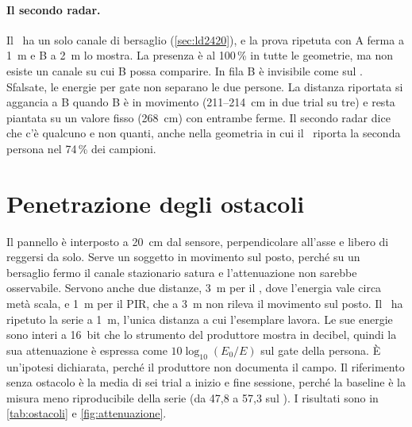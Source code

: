 \paragraph{Il secondo radar.} Il \ldc\ ha un solo canale di bersaglio
(\cref{sec:ld2420}), e la prova ripetuta con A ferma a 1~m e B a 2~m lo mostra. La
presenza è al 100\,\% in tutte le geometrie, ma non esiste un canale su cui B possa
comparire. In fila B è invisibile come sul \ldb. Sfalsate, le energie per gate non
separano le due persone. La distanza riportata si aggancia a B quando B è in
movimento (211--214~cm in due trial su tre) e resta piantata su un valore fisso
(268~cm) con entrambe ferme. Il secondo radar dice che c'è qualcuno e non quanti,
anche nella geometria in cui il \ldb\ riporta la seconda persona nel 74\,\% dei
campioni.

\section{Penetrazione degli ostacoli}
\label{sec:ostacoli}
\label{sec:ostacoli-portata}
\label{sec:ld2420-attenuazione}

Il pannello è interposto a 20~cm dal sensore, perpendicolare all'asse e libero di
reggersi da solo. Serve un soggetto in movimento sul posto, perché su un bersaglio
fermo il canale stazionario satura e l'attenuazione non sarebbe osservabile. Servono
anche due distanze, 3~m per il \ldb, dove l'energia vale circa metà scala, e 1~m per
il PIR, che a 3~m non rileva il movimento sul posto. Il \ldc\ ha ripetuto la serie a
1~m, l'unica distanza a cui l'esemplare lavora. Le sue energie sono interi a 16~bit
che lo strumento del produttore mostra in decibel, quindi la sua attenuazione è
espressa come $10\log_{10}(E_0/E)$ sul gate della persona. È un'ipotesi dichiarata,
perché il produttore non documenta il campo. Il riferimento senza ostacolo è la media
di sei trial a inizio e fine sessione, perché la baseline è la misura meno
riproducibile della serie (da 47,8 a 57,3 sul \ldb). I risultati sono in
\cref{tab:ostacoli} e \cref{fig:attenuazione}.

